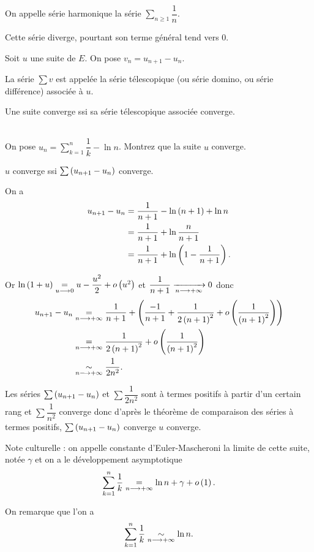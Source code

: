 \begin{ex}
On appelle série harmonique la série \(\sum_{n\geq1}\dfrac{1}{n}\).

Cette série diverge, pourtant son terme général tend vers \(0\).
\end{ex}

\begin{defi}
Soit \(u\) une suite de \(E\). On pose \(v_n=u_{n+1}-u_n\).

La série \(\sum v\) est appelée la série télescopique (ou série domino, ou série différence) associée à \(u\).
\end{defi}

\begin{prop}
Une suite converge ssi sa série télescopique associée converge.
\end{prop}

\begin{exo}~\\
On pose \(u_n=\sum_{k=1}^n\dfrac{1}{k}-\ln n\). Montrez que la suite \(u\) converge.
\end{exo}

\begin{corr}
\(u\) converge ssi \(\sum\left(u_{n+1}-u_n\right)\) converge.

On a \[\begin{aligned}
u_{n+1}-u_n&=\dfrac{1}{n+1}-\ln\left(n+1\right)+\ln n \\
&=\dfrac{1}{n+1}+\ln\dfrac{n}{n+1} \\
&=\dfrac{1}{n+1}+\ln\left(1-\dfrac{1}{n+1}\right).
\end{aligned}\]

Or \(\ln\left(1+u\right)\underset{u\longrightarrow0}{=}u-\dfrac{u^2}{2}+o\left(u^2\right)\) et \(\dfrac{1}{n+1}\xrightarrow[n\longrightarrow+\infty]{}0\) donc \[\begin{aligned}
u_{n+1}-u_n&\underset{n\longrightarrow+\infty}{=}\dfrac{1}{n+1}+\left(\dfrac{-1}{n+1}+\dfrac{1}{2\left(n+1\right)^2}+o\left(\dfrac{1}{\left(n+1\right)^2}\right)\right) \\
&\underset{n\longrightarrow+\infty}{=}\dfrac{1}{2\left(n+1\right)^2}+o\left(\dfrac{1}{\left(n+1\right)^2}\right) \\
&\underset{n\longrightarrow+\infty}{\sim}\dfrac{1}{2n^2}.
\end{aligned}\]

Les séries \(\sum\left(u_{n+1}-u_n\right)\) et \(\sum\dfrac{1}{2n^2}\) sont à termes positifs à partir d'un certain rang et \(\sum\dfrac{1}{n^2}\) converge donc d'après le théorème de comparaison des séries à termes positifs, \(\sum\left(u_{n+1}-u_n\right)\) converge \ie \(u\) converge.

Note culturelle : on appelle constante d'Euler-Mascheroni la limite de cette suite, notée \(\gamma\) et on a le développement asymptotique \[\sum_{k=1}^n\dfrac{1}{k}\underset{n\longrightarrow+\infty}{=}\ln n+\gamma+o\left(1\right).\]

On remarque que l'on a \[\sum_{k=1}^n\dfrac{1}{k}\underset{n\longrightarrow+\infty}{\sim}\ln n.\]
\end{corr}

